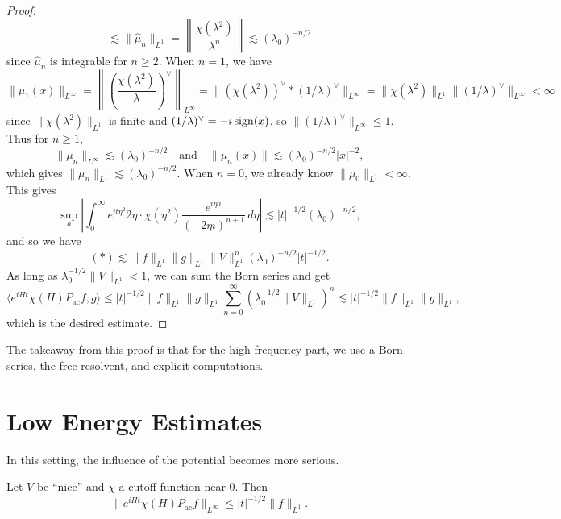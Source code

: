 \begin{proof}
\[    \lesssim \|\widehat{\mu}_n\|_{L^1}
    = \left\| \frac{\chi(\lambda^2)}{\lambda^n} \right\|
    \lesssim (\lambda_0)^{-n / 2}
  \]
  since $\widehat{\mu}_n$ is integrable for $n \ge 2$.
  When $n = 1$, we have
  \[
    \|\mu_1(x)\|_{L^\infty}
    = \left\| \left(\frac{\chi(\lambda^2)}{\lambda}\right)^\vee \right\|_{L^\infty}
    = \| (\chi(\lambda^2))^\vee * (1 / \lambda)^\vee \|_{L^\infty}
    = \| \chi(\lambda^2) \|_{L^1} \|(1 / \lambda)^\vee\|_{L^\infty} < \infty
  \]
  since $\|\chi(\lambda^2)\|_{L^1}$ is finite and
  $(1 / \lambda)^\vee = -i \operatorname{sign}(x)$, so
  $\|(1 / \lambda)^\vee\|_{L^\infty} \le 1$. Thus
  for $n \ge 1$,
  \[
    \|\mu_n\|_{L^\infty} \lesssim (\lambda_0)^{-n / 2}
    \quad \text{and} \quad
    \|\mu_n(x)\| \lesssim (\lambda_0)^{-n / 2} |x|^{-2},
  \]
  which gives $\|\mu_n \|_{L^1} \lesssim (\lambda_0)^{-n / 2}$.
  When $n = 0$, we already know
  $\|\mu_0\|_{L^1} < \infty$. This gives
  \[
    \sup_a \left| \int_0^\infty e^{it\eta^2} 2\eta \cdot \chi(\eta^2) \frac{e^{i \eta a}}{(-2\eta i)^{n + 1}}\, d\eta \right|
    \lesssim |t|^{-1 / 2} (\lambda_0)^{-n / 2},
  \]
  and so we have
  \[
    (*) \lesssim \|f\|_{L^1} \|g\|_{L^1} \|V\|_{L^1}^n (\lambda_0)^{-n / 2} |t|^{-1 / 2}.
  \]
  As long as $\lambda_0^{-1 / 2} \| V \|_{L^1} < 1$,
  we can sum the Born series and get
  \[
    \langle e^{iHt} \chi(H) P_{\mathrm{ac}} f, g \rangle
    \le |t|^{-1 / 2} \|f\|_{L^1} \|g\|_{L^1} \sum_{n = 0}^\infty (\lambda_0^{-1 / 2} \|V\|_{L^1})^n
    \lesssim |t|^{-1 / 2} \|f\|_{L^1} \|g\|_{L^1},
  \]
  which is the desired estimate.
\end{proof}

\begin{remark}
  The takeaway from this proof is that for the
  high frequency part, we use a Born series, the
  free resolvent, and explicit computations.
\end{remark}

\section{Low Energy Estimates}

\begin{remark}
  In this setting, the influence of the potential
  becomes more serious.
\end{remark}

\begin{lemma}
  Let $V$ be ``nice'' and $\chi$ a cutoff function
  near $0$. Then
  \[
    \| e^{iHt} \chi(H) P_{\mathrm{ac}} f \|_{L^\infty}
    \le |t|^{-1 / 2} \|f\|_{L^1}.
  \]
\end{lemma}


